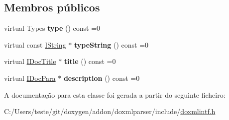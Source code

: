 \subsection*{Membros públicos}
\begin{DoxyCompactItemize}
\item 
\hypertarget{class_i_doc_simple_sect_a07f9c6361a316c0899d7e7338d045ec5}{virtual Types {\bfseries type} () const =0}\label{class_i_doc_simple_sect_a07f9c6361a316c0899d7e7338d045ec5}

\item 
\hypertarget{class_i_doc_simple_sect_a6b227ab8a5260d41d25327b442fe90a6}{virtual const \hyperlink{class_i_string}{I\-String} $\ast$ {\bfseries type\-String} () const =0}\label{class_i_doc_simple_sect_a6b227ab8a5260d41d25327b442fe90a6}

\item 
\hypertarget{class_i_doc_simple_sect_a1ee1dd58be84d0895b21f8f37d7dbd4f}{virtual \hyperlink{class_i_doc_title}{I\-Doc\-Title} $\ast$ {\bfseries title} () const =0}\label{class_i_doc_simple_sect_a1ee1dd58be84d0895b21f8f37d7dbd4f}

\item 
\hypertarget{class_i_doc_simple_sect_a66d14328150513d657e222a22970e2e5}{virtual \hyperlink{class_i_doc_para}{I\-Doc\-Para} $\ast$ {\bfseries description} () const =0}\label{class_i_doc_simple_sect_a66d14328150513d657e222a22970e2e5}

\end{DoxyCompactItemize}


A documentação para esta classe foi gerada a partir do seguinte ficheiro\-:\begin{DoxyCompactItemize}
\item 
C\-:/\-Users/teste/git/doxygen/addon/doxmlparser/include/\hyperlink{include_2doxmlintf_8h}{doxmlintf.\-h}\end{DoxyCompactItemize}
